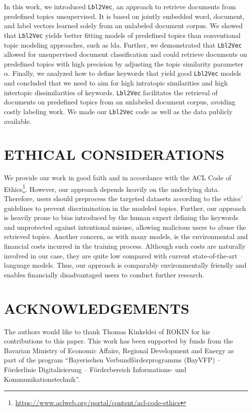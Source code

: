\documentclass[a4paper,twoside]{article}
\begin{document}
In this work, we introduced \texttt{Lbl2Vec}, an approach to retrieve documents from predefined topics unsupervised. It is based on jointly embedded word, document, and label vectors learned solely from an unlabeled document corpus. We showed that \texttt{Lbl2Vec} yields better fitting models of predefined topics than conventional topic modeling approaches, such as \ac{lda}. Further, we demonstrated that \texttt{Lbl2Vec} allowed for unsupervised document classification and could retrieve documents on predefined topics with high precision by adjusting the topic similarity parameter $\alpha$. Finally, we analyzed how to define keywords that yield good \texttt{Lbl2Vec} models and concluded that we need to aim for high intratopic similarities and high intertopic dissimilarities of keywords. \texttt{Lbl2Vec} facilitates the retrieval of documents on predefined topics from an unlabeled document corpus, avoiding costly labeling work. We made our \texttt{Lbl2Vec} code as well as the data publicly available.

\section{\uppercase{Ethical Considerations}}
\label{sec:ethical_considerations}

We provide our work in good faith and in accordance with the ACL Code of Ethics\footnote{\href{https://www.aclweb.org/portal/content/acl-code-ethics}{https://www.aclweb.org/portal/content/acl-code-ethics}}. However, our approach depends heavily on the underlying data. Therefore, users should preprocess the targeted datasets according to the ethics' guidelines to prevent discrimination in the modeled topics. Further, our approach is heavily prone to bias introduced by the human expert defining the keywords and unprotected against intentional misuse, allowing malicious users to abuse the retrieved topics. Another concern, as with many models, is the environmental and financial costs incurred in the training process. Although such costs are naturally involved in our case, they are quite low compared with current state-of-the-art language models. Thus, our approach is comparably environmentally friendly and enables financially disadvantaged users to conduct further research.

\section*{ACKNOWLEDGEMENTS}
\label{sec:acknowledgments}

The authors would like to thank Thomas Kinkeldei of ROKIN for his contributions to this paper. \newline
This work has been supported by funds from the Bavarian Ministry of Economic Affairs, Regional Development and Energy as part of the program “Bayerischen Verbundförderprogramms (BayVFP) – Förderlinie Digitalisierung – Förderbereich Informations- und Kommunikationstechnik”.


{\small
}
\end{document}
